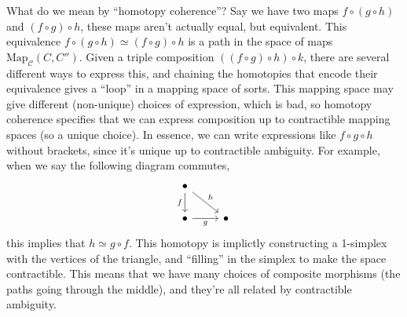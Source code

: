 What do we mean by ``homotopy coherence''? Say we have two maps $f \circ (g \circ h)$ and $(f \circ g) \circ h$, these maps aren't actually equal, but equivalent. This equivalence $f \circ (g \circ h) \simeq (f \circ g) \circ h$ is a path in the space of maps $\mathrm{Map }_{\mathcal{C} }(C,C'')$. Given a triple composition $((f \circ g) \circ h) \circ k$, there are several different ways to express this, and chaining the homotopies that encode their equivalence gives a ``loop'' in a mapping space of sorts. This mapping space may give different (non-unique) choices of expression, which is bad, so homotopy coherence specifies that we can express composition up to contractible mapping spaces (so a unique choice). In essence, we can write expressions like $f \circ g \circ h$ without brackets, since it's unique up to contractible ambiguity.
For example, when we say the following diagram commutes, \[
\begin{tikzcd}
    \bullet \arrow[d,"f"']\arrow[dr,"h"]& \\
    \bullet \arrow[r,"g"']& \bullet
\end{tikzcd}
\] this implies that $h\simeq g \circ f$. This homotopy is implictly constructing a 1-simplex with the vertices of the triangle, and ``filling'' in the simplex to make the space contractible. This means that we have many choices of composite morphisms (the paths going through the middle), and they're all related by contractible ambiguity.

